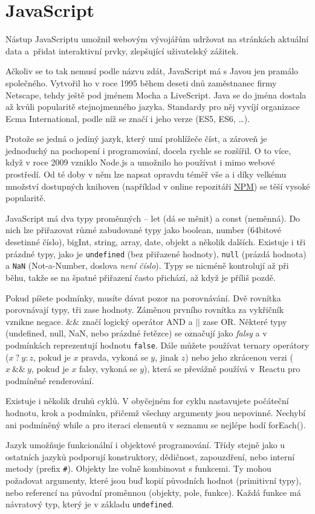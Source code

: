 \section{JavaScript}

Nástup JavaScriptu umožnil webovým vývojářům udržovat na stránkách aktuální data a~přidat interaktivní prvky, zlepšující uživatelský zážitek. 

Ačkoliv se to tak nemusí podle názvu zdát, JavaScript má s Javou jen pramálo společného. Vytvořil ho v roce 1995 během deseti dnů zaměstnanec firmy Netscape, tehdy ještě pod jménem Mocha a LiveScript. Java se do jména dostala až kvůli popularitě stejnojmenného jazyka. Standardy pro něj vyvíjí organizace Ecma International, podle níž se značí i jeho verze (ES5, ES6, \ldots).\cite{JSIntroduction}\cite{JSOrigins}\cite{JSHistory}

Protože se jedná o jediný jazyk, který umí prohlížeče číst, a zároveň je jednoduchý na pochopení i programování, docela rychle se rozšířil. O to více, když v roce 2009 vzniklo Node.js a umožnilo ho používat i mimo webové prostředí. Od té doby v něm lze napsat opravdu téměř vše a i díky velkému množství dostupných knihoven (například v online repozitáři \href{https://www.npmjs.com/}{NPM}) se těší vysoké popularitě.

JavaScript má dva typy proměnných – let (dá se měnit) a const (neměnná). Do nich lze přiřazovat různé zabudované typy jako boolean, number (64bitové desetinné číslo), bigInt, string, array, date, objekt a několik dalších. Existuje i tři prázdné typy, jako je \texttt{undefined} (bez přiřazené hodnoty), \texttt{null} (prázdá hodnota) a \texttt{NaN} (Not-a-Number, doslova \textit{není číslo}). Typy se nicméně kontrolují až při běhu, takže se na špatné přiřazení často přichází, až když je příliš pozdě.\cite{JSBasics}\cite{JSTypes}

Pokud píšete podmínky, musíte dávat pozor na porovnávání. Dvě rovnítka porovnávají typy, tři zase hodnoty. Záměnou prvního rovnítka za vykřičník vznikne negace. $\&\&$ značí logický operátor AND a $||$ zase OR. Některé typy (undefined, null, NaN, nebo prázdné řetězce) se označují jako \textit{falsy} a v podmínkách reprezentují hodnotu \texttt{false}. Dále můžete používat ternary operátory ($x\ ?\ y : z$, pokud je $x$ pravda, vykoná se $y$, jinak $z$) nebo jeho zkrácenou verzi ($x\ \&\&\ y$, pokud je $x$ falsy, vykoná se $y$), která se převážně používá v~Reactu pro podmíněné renderování.

Existuje i několik druhů cyklů. V obyčejném for cyklu nastavujete počáteční hodnotu, krok a podmínku, přičemž všechny argumenty jsou nepovinné. Nechybí ani podmíněný while a pro iteraci elementů v seznamu se nejlépe hodí forEach().

Jazyk umožňuje funkcionální i objektové programování. Třídy stejně jako u ostatních jazyků podporují konstruktory, dědičnost, zapouzdření, nebo interní metody (prefix \texttt{\#}). Objekty lze volně kombinovat s funkcemi. Ty mohou požadovat argumenty, které jsou buď kopií původních hodnot (primitivní typy), nebo referencí na původní proměnnou (objekty, pole, funkce). Každá funkce má návratový typ, který je v základu \texttt{undefined}.\cite{JSFunctions}\cite{JSFunctionalProgramming}